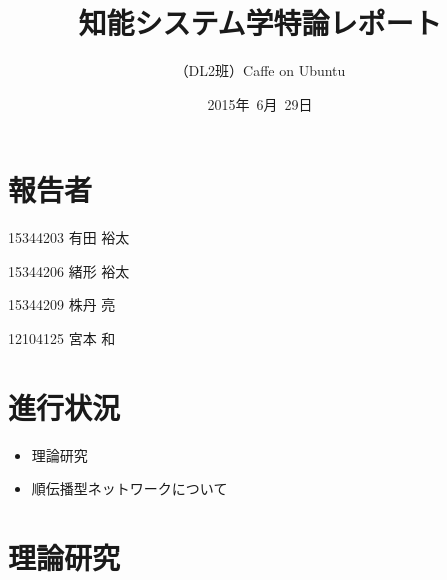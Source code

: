 \documentclass[a4paper,10pt]{jsarticle}
\title{知能システム学特論レポート}
\author{
（DL2班）Caffe on Ubuntu\\
}
\date{2015年\ 6月\ 29日}
\begin{document}
\maketitle
\section{報告者}
\begin{list}{}{}
 \item 15344203\hspace{0.5cm} 有田 裕太
 \item 15344206\hspace{0.5cm} 緒形 裕太
 \item 15344209\hspace{0.5cm} 株丹 亮
 \item 12104125\hspace{0.5cm} 宮本 和
\end{list}

\section{進行状況}

\begin{itemize}
\item 理論研究
\item 順伝播型ネットワークについて
\end{itemize}


\section{理論研究}
\end{document}
